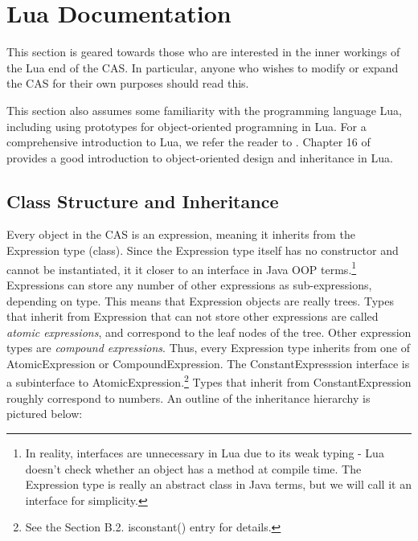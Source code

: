 \documentclass{article}
\begin{document}
\section{Lua Documentation}

This section is geared towards those who are interested in the inner workings of the Lua end of the CAS. In particular, anyone who wishes to modify or expand the CAS for their own purposes should read this.
 
This section also assumes some familiarity with the programming language Lua, including using prototypes for object-oriented programning in Lua. For a comprehensive introduction to Lua, we refer the reader to \cite{pil}. Chapter 16 of \cite{pil} provides a good introduction to object-oriented design and inheritance in Lua. 
 
 \subsection{Class Structure and Inheritance}
 
Every object in the CAS is an expression, meaning it inherits from the {\ttfamily Expression} type (class). Since the {\ttfamily Expression} type itself has no constructor and cannot be instantiated, it it closer to an interface in Java OOP terms.\footnote{In reality, interfaces are unnecessary in Lua due to its weak typing - Lua doesn't check whether an object has a method at compile time. The {\ttfamily Expression} type is really an abstract class in Java terms, but we will call it an interface for simplicity.} {\ttfamily Expression}s can store any number of other expressions as sub-expressions, depending on type. This means that {\ttfamily Expression} objects are really trees. Types that inherit from {\ttfamily Expression} that can not store other expressions are called \emph{atomic expressions}, and correspond to the leaf nodes of the tree. Other expression types are \emph{compound expressions}. Thus, every {\ttfamily Expression} type inherits from one of {\ttfamily AtomicExpression} or {\ttfamily CompoundExpression}. The {\ttfamily ConstantExpresssion} interface is a subinterface to {\ttfamily AtomicExpression}.\footnote{See the Section B.2. {\ttfamily isconstant()} entry for details.} Types that inherit from {\ttfamily ConstantExpression} roughly correspond to numbers. An outline of the inheritance hierarchy is pictured below:
\end{document}
